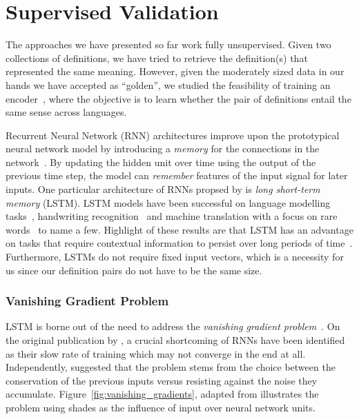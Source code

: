 
\chapter{Supervised Validation}%
\label{chap:supervised_validation}

The approaches we have presented so far work fully unsupervised.
Given two collections of definitions, we have tried to retrieve the definition(s) that represented the same meaning.
However, given the moderately sized data in our hands we have accepted as \enquote{golden}, we studied the feasibility of training an encoder~\cite{sutskever_sequence_2014}, where the objective is to learn whether the pair of definitions entail the same sense across languages.

Recurrent Neural Network (RNN) architectures improve upon the prototypical neural network model by introducing a \emph{memory} for the connections in the network~\cite{rumelhart_learning_1986}.
By updating the hidden unit over time using the output of the previous time step, the model can \emph{remember} features of the input signal for later inputs.
One particular architecture of RNNs propsed by \textcite{hochreiter_long_1997} is \emph{long short-term memory} (LSTM).
LSTM models have been successful on language modelling tasks~\cite{sutskever_sequence_2014}, handwriting recognition~\cite{graves_unconstrained_2008,graves_novel_2009} and machine translation with a focus on rare words~\cite{luong_addressing_2014} to name a few.
Highlight of these results are that LSTM has an advantage on tasks that require contextual information to persist over long periods of time~\cite{graves_long_2012}.
Furthermore, LSTMs do not require fixed input vectors, which is a necessity for us since our definition pairs do not have to be the same size.

\subsection{Vanishing Gradient Problem}%
\label{sub:vanishing_gradient_problem}

LSTM is borne out of the need to address the \emph{vanishing gradient problem}~\cite{hochreiter_long_1997, bengio_learning_1994}.
On the original publication by \textcite{hochreiter_long_1997}, a crucial shortcoming of RNNs have been identified as their slow rate of training which may not converge in the end at all.
Independently, \textcite{bengio_learning_1994} suggested that the problem stems from the choice between the conservation of the previous inputs versus resisting against the noise they accumulate.
Figure~\ref{fig:vanishing_gradients}, adapted from \textcite{graves_long_2012} illustrates the problem using shades as the influence of input over neural network units.

